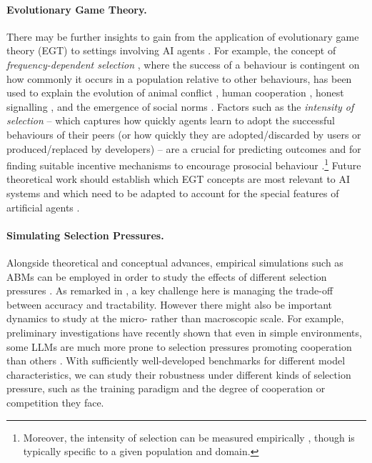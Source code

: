 \paragraph{Evolutionary Game Theory.} 
There may be further insights to gain from the application of {evolutionary game theory} (EGT) \citep{hofbauer1998evolutionary,sandholm2010population,Fernandez2020} 
to settings involving AI agents \citep{lu2024llms,zimmaro2024emergence,Han2021,santos2019evolution,guo2023facilitating}.
For example, the concept of \textit{frequency-dependent selection} \citep{lewontin1958general}, where the success of a behaviour is contingent on how commonly it occurs in a population relative to other behaviours, has been used to explain the evolution of animal conflict \citep{smith1973logic}, human cooperation \citep{nowak2006five}, honest signalling \citep{grafen1990biological}, and the emergence of social norms \citep{hawkins2019emergence}.
Factors such as the \textit{intensity of selection} -- which captures how quickly agents learn to adopt the successful behaviours of their peers (or how quickly they are adopted/discarded by users or produced/replaced by developers) -- are a crucial for predicting outcomes \citep{traulsen2007pairwise,sigmund2010social} and for finding suitable incentive mechanisms to encourage prosocial behaviour \citep{duong2021cost,han2024evolutionary}.\footnote{Moreover, the intensity of selection can be measured empirically \citep{rand2013evolution,traulsen2010human}, though is typically specific to a given population and domain.}
Future theoretical work should establish which EGT concepts are most relevant to AI systems and which need to be adapted to account for the special features of artificial agents \citep{Han2021,Conitzer2023,dafoe2021cooperative}.

\paragraph{Simulating Selection Pressures.}
Alongside theoretical and conceptual advances, empirical {simulations} such as ABMs can be employed in order to study the effects of different selection pressures \citep{adami2016evolutionary,gilbert2019agent,vestad_survey_2024}.
As remarked in , a key challenge here is managing the trade-off between accuracy and tractability.
However there might also be important dynamics to study at the micro- rather than macroscopic scale.
For example, preliminary investigations have recently shown that even in simple environments, some LLMs are much more prone to selection pressures promoting cooperation than others \citep[see also ]{Vallinder2024}.
With sufficiently well-developed benchmarks for different model characteristics, we can study their robustness under different kinds of selection pressure, such as the training paradigm and the degree of cooperation or competition they face.













